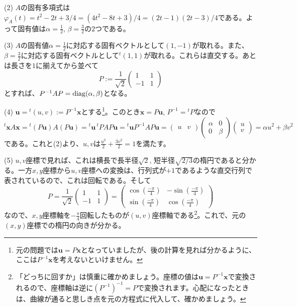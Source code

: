 \noindent (2) $A$の固有多項式は$\varphi_A(t) = t^2 - 2t + 3/4 = (4t^2 - 8t + 3)/4 = (2t - 1)(2t - 3)/4$である。よって固有値は$\alpha = \frac{1}{2}$, $\beta = \frac{3}{2}$の$2$つである。

\noindent (3) $A$の固有値$\alpha = \frac{1}{2}$に対応する固有ベクトルとして$(1, -1)$が取れる。また、$\beta = \frac{3}{2}$に対応する固有ベクトルとして${}^t(1, 1)$が取れる。これらは直交する。あとは長さを$1$に揃えてから並べて
\[
P :=
\frac{1}{\sqrt{2}}
\begin{pmatrix}
1 & 1 \\
-1 & 1
\end{pmatrix}
\]
とすれば、$P^{-1} A P = \operatorname{diag}(\alpha, \beta)$となる。

\noindent (4) $\bm{u} = {}^t(u, v) := P^{-1}\bm{x}$とする\footnote{元の問題では$\bm{u} = P\bm{x}$となっていましたが、後の計算を見れば分かるように、ここは$P^{-1} \bm{x}$を考えないといけません。}。このとき$\bm{x} = P\bm{u}$, $P^{-1} = {}^tP$なので
\[
{}^t\bm{x} A \bm{x} = {}^t(P\bm{u}) A (P\bm{u}) = {}^t\bm{u}\, {}^tP A P \bm{u} = {}^t\bm{u} P^{-1} A P \bm{u} = 
\begin{pmatrix}
u & v
\end{pmatrix}
\begin{pmatrix}
\alpha & 0 \\
0 & \beta
\end{pmatrix}
\begin{pmatrix}
u \\
v
\end{pmatrix}
= \alpha u^2 + \beta v^2
\]
である。これと(2)より、$u, v$は$\frac{u^2}{2} + \frac{3 v^2}{2} = 1$を満たす。

\noindent (5) $u, v$座標で見れば、これは横長で長半径$\sqrt{2}$, 短半径$\sqrt{2/3}$の楕円であると分かる。一方$x, y$座標から$u, v$座標への変換は、行列式が$+1$であるような直交行列で表されているので、これは回転である。そして
\[
P =
\frac{1}{\sqrt{2}}
\begin{pmatrix}
1 & 1 \\
-1 & 1
\end{pmatrix}
=
\begin{pmatrix}
\cos (\frac{-\pi}{4}) & - \sin (\frac{-\pi}{4}) \\
\sin (\frac{-\pi}{4}) & \cos (\frac{-\pi}{4})
\end{pmatrix}
\]
なので、$x, y$座標軸を$-\frac{\pi}{4}$回転したものが$(u, v)$座標軸である\footnote{「どっちに回すか」は慎重に確かめましょう。座標の値は$\bm{u} = P^{-1}\bm{x}$で変換されるので、座標軸は逆に$(P^{-1})^{-1} = P$で変換されます。心配になったときは、曲線が通ると思しき点を元の方程式に代入して、確かめましょう。}。これで、元の$(x, y)$座標での楕円の向きが分かる。

